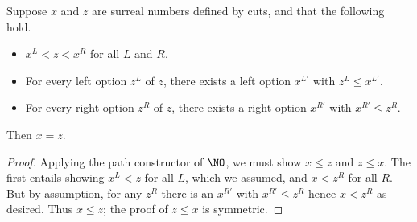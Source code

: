 \begin{thm}\label{thm:NO-simplicity}
  Suppose $x$ and $z$ are surreal numbers defined by cuts, and that the following hold.
  \begin{itemize}
  \item $x^L < z < x^R$ for all $L$ and $R$.
  \item For every left option $z^L$ of $z$, there exists a left option $x^{L'}$ with $z^L\le x^{L'}$.
  \item For every right option $z^R$ of $z$, there exists a right option $x^{R'}$ with $x^{R'}\le z^R$.
  \end{itemize}
  Then $x=z$.
\end{thm}
\begin{proof}
  Applying the path constructor of $\NO$, we must show $x\le z$ and $z\le x$.
  The first entails showing $x^L<z$ for all $L$, which we assumed, and $x<z^R$ for all $R$.
  But by assumption, for any $z^R$ there is an $x^{R'}$ with $x^{R'}\le z^R$ hence $x<z^R$ as desired.
  Thus $x\le z$; the proof of $z\le x$ is symmetric.
\end{proof}

